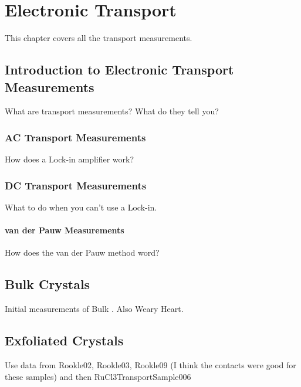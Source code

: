 \chapter{Electronic Transport}
This chapter covers all the transport measurements.

\section{Introduction to Electronic Transport Measurements}

What are transport measurements? What do they tell you?

\subsection{AC Transport Measurements}

How does a Lock-in amplifier work?

\subsection{DC Transport Measurements}

What to do when you can't use a Lock-in.

\subsubsection{van der Pauw Measurements}

How does the van der Pauw method word?

\section{\texorpdfstring{\rucl}{RuCl3} Bulk Crystals}

Initial measurements of Bulk \ruclnospace . Also Weary Heart.

\section{Exfoliated \texorpdfstring{\rucl}{RuCl3} Crystals}

Use data from Rookle02, Rookle03, Rookle09 (I think the contacts were good for these samples) and then RuCl3TransportSample006